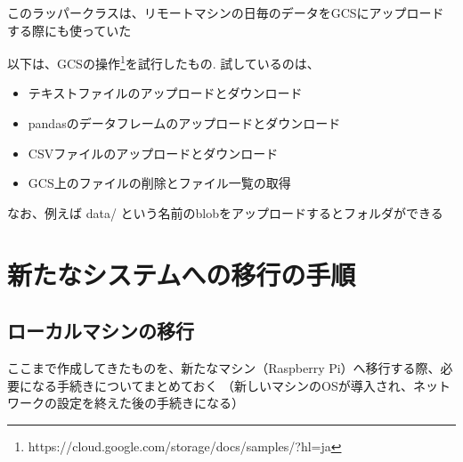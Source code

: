 \documentclass[12pt,a4j]{jsbook}
\begin{document}


このラッパークラスは、リモートマシンの日毎のデータをGCSにアップロードする際にも使っていた

以下は、GCSの操作\footnote{https://cloud.google.com/storage/docs/samples/?hl=ja}を試行したもの. 試しているのは、
\begin{itemize}
	\item テキストファイルのアップロードとダウンロード
	\item pandasのデータフレームのアップロードとダウンロード
	\item CSVファイルのアップロードとダウンロード
	\item GCS上のファイルの削除とファイル一覧の取得
\end{itemize}
なお、例えば data/ という名前のblobをアップロードするとフォルダができる

\newpage



\section{新たなシステムへの移行の手順}

\subsection{ローカルマシンの移行}

ここまで作成してきたものを、新たなマシン（Raspberry Pi）へ移行する際、必要になる手続きについてまとめておく
（新しいマシンのOSが導入され、ネットワークの設定を終えた後の手続きになる）
\end{document}
